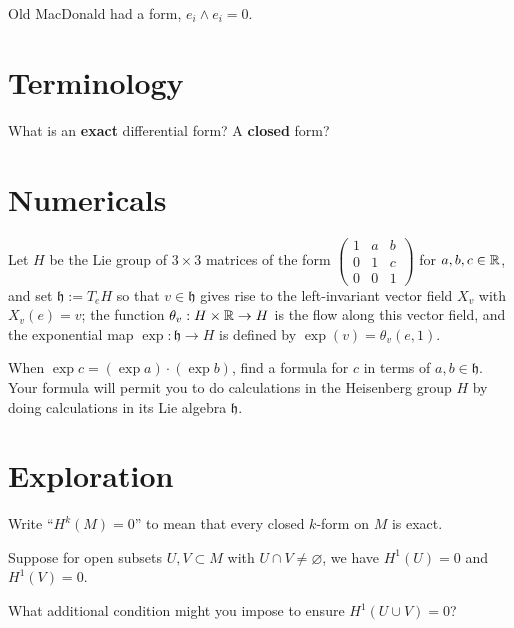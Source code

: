 \documentclass{homework}
\author{Jim Fowler}
\begin{document}
\maketitle

\begin{inspiration}
  Old MacDonald had a form, $e_i \wedge e_i = 0$. 
\end{inspiration}

\section{Terminology}

\begin{problem}
  What is an \textbf{exact} differential form?  A \textbf{closed} form?
\end{problem}

\section{Numericals}

\begin{problem}\label{heisenberg-group} Let $H$ be the Lie group of $3 \times 3$ matrices of
the form 
  $\displaystyle\begin{pmatrix}
    1 & a & b \\
    0 & 1 & c \\
    0 & 0 & 1
  \end{pmatrix}$ for $a, b, c \in \mathbb{R}$, and set $\mathfrak{h} := T_e H$
so that $v \in \mathfrak{h}$ gives rise to the left-invariant vector
field $X_v$ with $X_v(e) = v$; the function $\theta_{v} : H \times \mathbb{R}
\to H$ is the flow along this vector field, and the exponential map
$\exp : \mathfrak{h} \to H$ is defined by $\exp(v) = \theta_v(e,1)$.

When $\exp c = (\exp a) \cdot (\exp b)$, find a formula for $c$ in
terms of $a, b \in \mathfrak{h}$.  Your formula will permit you to do
calculations in the Heisenberg group $H$ by doing calculations in its Lie
algebra $\mathfrak{h}$.
\end{problem}

\section{Exploration}

\begin{problem}
Write ``$H^k(M) = 0$'' to mean that every closed $k$-form on $M$ is exact.

  Suppose for open subsets $U, V \subset M$ with $U \cap V \neq
  \varnothing$, we have $H^1(U) = 0$ and $H^1(V) = 0$.

  What additional condition might you impose to ensure $H^1(U \cup V)
= 0$?
\end{problem}
\end{document}
